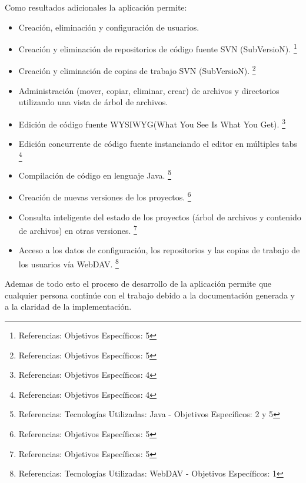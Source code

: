 Como resultados adicionales la aplicación permite:

\begin{itemize}
	
	\item Creación, eliminación y configuración de usuarios.
	
	\item Creación y eliminación de repositorios de código fuente SVN (SubVersioN).
	\footnote {Referencias: Objetivos Específicos: 5}
	
	\item Creación y eliminación de copias de trabajo SVN (SubVersioN).
	\footnote {Referencias: Objetivos Específicos: 5}
	
	\item Administración (mover, copiar, eliminar, crear) de archivos y directorios utilizando una vista de árbol de archivos.
	
	\item Edición de código fuente WYSIWYG(What You See Is What You Get).
	\footnote {Referencias: Objetivos Específicos: 4}
	
	\item Edición concurrente de código fuente instanciando el editor en múltiples tabs
	\footnote {Referencias: Objetivos Específicos: 4}
	
	\item Compilación de código en lenguaje Java.
	\footnote {Referencias: Tecnologías Utilizadas: Java - Objetivos Específicos: 2 y 5}
	
	\item Creación de nuevas versiones de los proyectos.
	\footnote {Referencias: Objetivos Específicos: 5}
	
	\item Consulta inteligente del estado de los proyectos (árbol de archivos y contenido de archivos) en otras versiones.
	\footnote {Referencias: Objetivos Específicos: 5}
	
	\item Acceso a los datos de configuración, los repositorios y las copias de trabajo de los usuarios vía WebDAV.
	\footnote {Referencias: Tecnologías Utilizadas: WebDAV - Objetivos Específicos: 1}
	
\end{itemize}

Ademas de todo esto el proceso de desarrollo de la aplicación permite que cualquier persona continúe con el trabajo debido a la documentación generada y a la claridad de la implementación.


